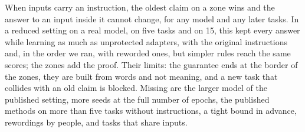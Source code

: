 When inputs carry an instruction, the oldest claim on a zone wins and the answer to an input inside it
cannot change, for any model and any later tasks. In a reduced setting on a real model, on five tasks and on 15, this kept every answer while learning
as much as unprotected adapters, with the original instructions and, in the order we ran, with reworded ones, but simpler rules reach the same scores; the zones add the proof. Their
limits: the guarantee ends at the border of the zones, they are built from words and not meaning, and a
new task that collides with an old claim is blocked. Missing are the larger model of the published
setting, more seeds at the full number of epochs, the published methods on more than five tasks without instructions, a tight
bound in advance, rewordings by people, and tasks that share inputs.
